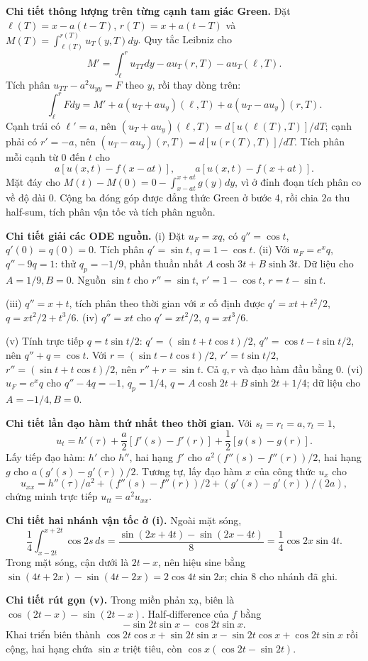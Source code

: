 \textbf{Chi tiết thông lượng trên từng cạnh tam giác Green.} Đặt $\ell(T)=x-a(t-T)$, $r(T)=x+a(t-T)$ và $M(T)=\int_{\ell(T)}^{r(T)}u_T(y,T)dy$. Quy tắc Leibniz cho
\[M'=\int_\ell^r u_{TT}dy-a u_T(r,T)-a u_T(\ell,T).\]
Tích phân $u_{TT}-a^2u_{yy}=F$ theo $y$, rồi thay dòng trên:
\[\int_\ell^r Fdy=M'+a(u_T+a u_y)(\ell,T)+a(u_T-a u_y)(r,T).\]
Cạnh trái có $\ell'=a$, nên $(u_T+a u_y)(\ell,T)=d[u(\ell(T),T)]/dT$; cạnh phải có $r'=-a$, nên $(u_T-a u_y)(r,T)=d[u(r(T),T)]/dT$. Tích phân mỗi cạnh từ $0$ đến $t$ cho
\[a[u(x,t)-f(x-at)],\qquad a[u(x,t)-f(x+at)].\]
Mặt đáy cho $M(t)-M(0)=0-\int_{x-at}^{x+at}g(y)dy$, vì ở đỉnh đoạn tích phân co về độ dài $0$. Cộng ba đóng góp được đẳng thức Green ở bước 4, rồi chia $2a$ thu half-sum, tích phân vận tốc và tích phân nguồn.

\textbf{Chi tiết giải các ODE nguồn.} (i) Đặt $u_F=xq$, có $q''=\cos t$, $q'(0)=q(0)=0$. Tích phân $q'=\sin t$, $q=1-\cos t$. (ii) Với $u_F=e^xq$, $q''-9q=1$: thử $q_p=-1/9$, phần thuần nhất $A\cosh3t+B\sinh3t$. Dữ liệu cho $A=1/9,B=0$. Nguồn $\sin t$ cho $r''=\sin t$, $r'=1-\cos t$, $r=t-\sin t$.

(iii) $q''=x+t$, tích phân theo thời gian với $x$ cố định được $q'=xt+t^2/2$, $q=xt^2/2+t^3/6$. (iv) $q''=xt$ cho $q'=xt^2/2$, $q=xt^3/6$.

(v) Tính trực tiếp $q=t\sin t/2$: $q'=(\sin t+t\cos t)/2$, $q''=\cos t-t\sin t/2$, nên $q''+q=\cos t$. Với $r=(\sin t-t\cos t)/2$, $r'=t\sin t/2$, $r''=(\sin t+t\cos t)/2$, nên $r''+r=\sin t$. Cả $q,r$ và đạo hàm đầu bằng $0$. (vi) $u_F=e^xq$ cho $q''-4q=-1$, $q_p=1/4$, $q=A\cosh2t+B\sinh2t+1/4$; dữ liệu cho $A=-1/4,B=0$.

\textbf{Chi tiết lần đạo hàm thứ nhất theo thời gian.} Với $s_t=r_t=a,\tau_t=1$,
\[u_t=h'(\tau)+\frac a2[f'(s)-f'(r)]+\frac12[g(s)-g(r)].\]
Lấy tiếp đạo hàm: $h'$ cho $h''$, hai hạng $f'$ cho $a^2(f''(s)-f''(r))/2$, hai hạng $g$ cho $a(g'(s)-g'(r))/2$. Tương tự, lấy đạo hàm $x$ của công thức $u_x$ cho
\[u_{xx}=h''(\tau)/a^2+(f''(s)-f''(r))/2+(g'(s)-g'(r))/(2a),\]
chứng minh trực tiếp $u_{tt}=a^2u_{xx}$.

\textbf{Chi tiết hai nhánh vận tốc ở (i).} Ngoài mặt sóng,
\[\frac14\int_{x-2t}^{x+2t}\cos2s\,ds
=\frac{\sin(2x+4t)-\sin(2x-4t)}8=\frac14\cos2x\sin4t.\]
Trong mặt sóng, cận dưới là $2t-x$, nên hiệu sine bằng $\sin(4t+2x)-\sin(4t-2x)=2\cos4t\sin2x$; chia $8$ cho nhánh đã ghi.

\textbf{Chi tiết rút gọn (v).} Trong miền phản xạ, biên là $\cos(2t-x)-\sin(2t-x)$. Half-difference của $f$ bằng
\[-\sin2t\sin x-\cos2t\sin x.\]
Khai triển biên thành $\cos2t\cos x+\sin2t\sin x-\sin2t\cos x+\cos2t\sin x$ rồi cộng, hai hạng chứa $\sin x$ triệt tiêu, còn $\cos x(\cos2t-\sin2t)$.

